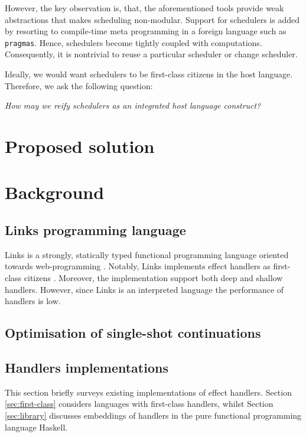 \documentclass[preprint,10pt,numbers]{sigplanconf}
\begin{document}
However, the key observation is, that, the aforementioned tools provide weak abstractions that makes scheduling non-modular. Support for schedulers is added by resorting to compile-time meta programming in a foreign language such as \texttt{pragmas}. Hence, schedulers become tightly coupled with computations. Consequently, it is nontrivial to reuse a particular scheduler or change scheduler.

Ideally, we would want schedulers to be first-class citizens in the host language. Therefore, we ask the following question:
\begin{center}
  \emph{How may we reify schedulers as an integrated host language construct?}
\end{center}

  \section{Proposed solution}

  \section{Background}
  \subsection{Links programming language}
  Links is a strongly, statically typed functional programming language oriented towards web-programming \cite{Cooper2006}. Notably, Links implements effect handlers as first-class citizens \cite{Hillerstrom2015}. Moreover, the implementation support both deep and shallow handlers. However, since Links is an interpreted language the performance of handlers is low.

  \subsection{Optimisation of single-shot continuations}

  \subsection{Handlers implementations}
  This section briefly surveys existing implementations of effect handlers. Section \ref{sec:first-class} considers languages with first-class handlers, whilst Section \ref{sec:library} discusses embeddings of handlers in the pure functional programming language Haskell.
\end{document}
